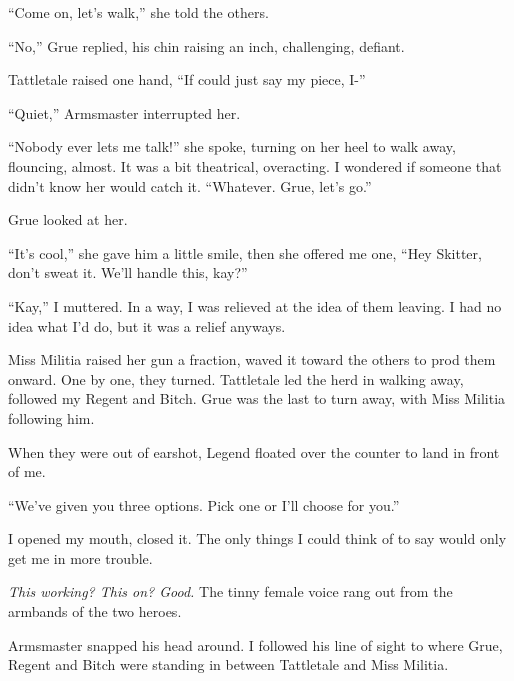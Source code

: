 ``Come on, let's walk,'' she told the others.



``No,'' Grue replied, his chin raising an inch, challenging, defiant.



Tattletale raised one hand, ``If  could just say my piece, I-''



``Quiet,'' Armsmaster interrupted her.



``Nobody ever lets me talk!'' she spoke, turning on her heel to walk away, flouncing, almost.  It was a bit theatrical, overacting.  I wondered if someone that didn't know her would catch it.  ``Whatever.  Grue, let's go.''



Grue looked at her.



``It's cool,'' she gave him a little smile, then she offered me one, ``Hey Skitter, don't sweat it.  We'll handle this, kay?''



``Kay,'' I muttered.  In a way, I was relieved at the idea of them leaving.  I had no idea what I'd do, but it was a relief anyways.



Miss Militia raised her gun a fraction, waved it toward the others to prod them onward.  One by one, they turned.  Tattletale led the herd in walking away, followed my Regent and Bitch.  Grue was the last to turn away, with Miss Militia following him.



When they were out of earshot, Legend floated over the counter to land in front of me.



``We've given you three options.  Pick one or I'll choose for you.''



I opened my mouth, closed it.  The only things I could think of to say would only get me in more trouble.



\emph{This working?  This on?  Good.  }The tinny female voice rang out from the armbands of the two heroes.



Armsmaster snapped his head around.\emph{  }I followed his line of sight to where Grue, Regent and Bitch were standing in between Tattletale and Miss Militia.



